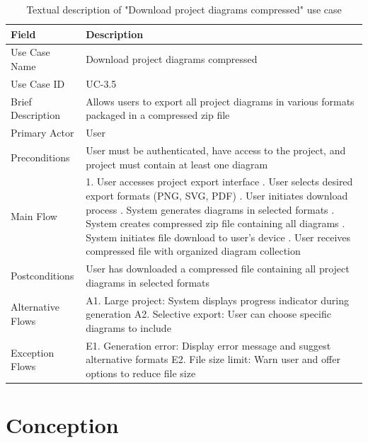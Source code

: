 \begin{table}[H]
\centering
\caption{Textual description of "Download project diagrams compressed" use case}
\label{tab:download_project_usecase}
\begin{tabular}{|p{3cm}|p{10cm}|}
\hline
\textbf{Field} & \textbf{Description} \\
\hline
Use Case Name & Download project diagrams compressed \\
\hline
Use Case ID & UC-3.5 \\
\hline
Brief Description & Allows users to export all project diagrams in various formats packaged in a compressed zip file \\
\hline
Primary Actor & User \\
\hline
Preconditions & User must be authenticated, have access to the project, and project must contain at least one diagram \\
\hline
Main Flow & 1. User accesses project export interface \newline 2. User selects desired export formats (PNG, SVG, PDF) \newline 3. User initiates download process \newline 4. System generates diagrams in selected formats \newline 5. System creates compressed zip file containing all diagrams \newline 6. System initiates file download to user's device \newline 7. User receives compressed file with organized diagram collection \\
\hline
Postconditions & User has downloaded a compressed file containing all project diagrams in selected formats \\
\hline
Alternative Flows & A1. Large project: System displays progress indicator during generation \newline A2. Selective export: User can choose specific diagrams to include \\
\hline
Exception Flows & E1. Generation error: Display error message and suggest alternative formats \newline E2. File size limit: Warn user and offer options to reduce file size \\
\hline
\end{tabular}
\end{table}

\section{Conception}

